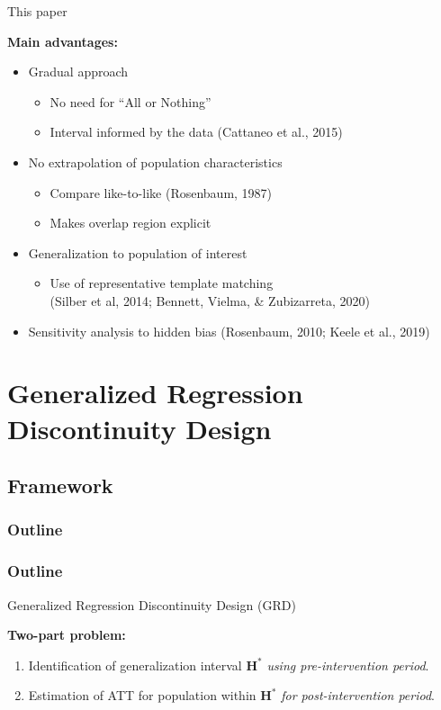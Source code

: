 \documentclass[usenames,dvipsnames,11pt,aspectratio=169]{beamer}
\begin{document}
\begin{frame}{This paper}

\textbf{Main advantages:}
\begin{itemize}
\item Gradual approach 
\begin{itemize}
\item No need for ``All or Nothing''
\item Interval informed by the data {\tiny (Cattaneo et al., 2015)}
\end{itemize}
\vspace{0.1cm}
\item No extrapolation of population characteristics
\begin{itemize}
\item Compare like-to-like {\tiny (Rosenbaum, 1987)}
\item Makes overlap region explicit
\end{itemize}
\vspace{0.1cm}
\item Generalization to population of interest
\begin{itemize}
\item Use of representative template matching \\ {\tiny (Silber et al, 2014; Bennett, Vielma, \& Zubizarreta, 2020)}
\end{itemize}
\vspace{0.1cm}
\item Sensitivity analysis to hidden bias {\tiny (Rosenbaum, 2010; Keele et al., 2019)}
\end{itemize}
\end{frame}


\section{Generalized Regression Discontinuity Design}
\subsection{Framework}

\begin{frame}
\frametitle{Outline}
\tableofcontents
\end{frame}

\begin{frame}
\frametitle{Outline}
\end{frame}

\begin{frame}{Generalized Regression Discontinuity Design (GRD)}

\textbf{Two-part problem:}
\begin{enumerate}
\item Identification of generalization interval $\mathbf{H^*}$ \textit{using pre-intervention period}.
\vspace{0.1cm}
\item Estimation of ATT for population within $\mathbf{H^*}$ \textit{for post-intervention period}.
\end{enumerate}
\end{frame}
\end{document}
